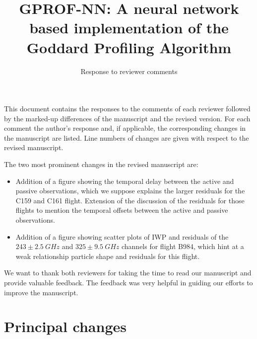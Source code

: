 \documentclass[11pt]{scrreprt}
\title{GPROF-NN: A neural network based implementation of the Goddard Profiling Algorithm}
\subtitle{Response to reviewer comments}
\date{}
\begin{document}
\maketitle

\setlength{\parindent}{0cm}

This document contains the responses to the comments of each reviewer followed
by the marked-up differences of the manuscript and the revised version. For each
comment the author's response and, if applicable, the corresponding changes in
the manuscript are listed. Line numbers of changes are given with respect to the
revised manuscript.

The two most prominent changes in the revised manuscript are:
\begin{itemize}
\item Addition of a figure showing the temporal delay between the active and
  passive observations, which we suppose explains the larger residuals for the
  C159 and C161 flight. Extension of the discussion of the residuals for those
  flights to mention the temporal offsets between the active and passive
  observations.
\item Addition of a figure  showing scatter plots of IWP and residuals of the
  $243\pm 2.5\ \unit{GHz}$ and $325\pm 9.5\ \unit{GHz}$ channels for flight B984,
  which hint at a weak relationship particle shape and residuals for this flight.
\end{itemize}

%

We want to thank both reviewers for taking the time to read our manuscript and
provide valuable feedback. The feedback was very helpful in guiding our efforts
to improve the manuscript.

\section{Principal changes}
\end{document}
